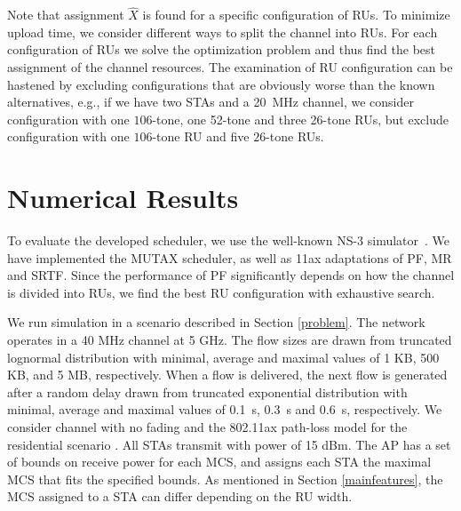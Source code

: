 Note that assignment $\hat X$ is found for a specific configuration of RUs.
To minimize upload time, we consider different ways to split the channel into RUs. For each configuration of RUs we solve the optimization problem and thus find the best assignment of the channel resources.
The examination of RU configuration can be hastened by excluding configurations that are obviously worse than the known alternatives, e.g., if we have two STAs and a \SI{20}{\MHz} channel, we consider configuration with one $106$-tone, one 52-tone and three 26-tone RUs, but exclude configuration with one $106$-tone RU and five $26$-tone RUs.

\section{Numerical  Results}
\label{numerical}
To evaluate the developed scheduler, we use  the well-known NS-3 simulator~\cite{ns-3}.
We have implemented the MUTAX scheduler, as well as 11ax adaptations of PF, MR and SRTF.
Since the performance of PF significantly depends on how the channel is divided into RUs, we find the best RU configuration with exhaustive search.

We run simulation in a scenario described in Section \ref{problem}.
The network operates in a 40 MHz channel at 5 GHz.
The flow sizes are drawn from truncated lognormal distribution with minimal, average and maximal values of 1 KB, 500 KB, and 5 MB, respectively. When a flow is delivered, the next flow is generated after a random delay drawn from truncated exponential distribution with minimal, average and maximal values of \SI{0.1}{\s}, \SI{0.3}{\s} and \SI{0.6}{\s}, respectively.
We consider channel with no fading and the 802.11ax path-loss model for the residential scenario \cite{presentation_scenarios}.
All STAs transmit with power of 15 dBm.
The AP has a set of bounds on receive power for each MCS, and assigns each STA the maximal MCS that fits the specified bounds.
As mentioned in Section \ref{mainfeatures}, the MCS assigned to a STA can differ depending on the RU width.

